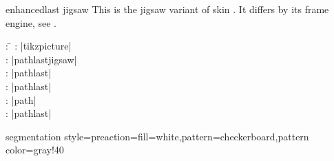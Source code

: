 \clearpage
\begin{docSkin}{enhancedlast jigsaw}
  This is the jigsaw variant of skin .
  It differs by its frame engine, see .
\begin{tcolorbox}[skintable=enhancedlast]
  \begin{tabbing}
    : \=\kill
    :  \> |tikzpicture|\\ 
    :           \> |pathlastjigsaw|\\
    : \> |pathlast|\\ 
    :        \> |pathlast|\\
    :    \> |path|\\
    :           \> |pathlast|
  \end{tabbing}
\end{tcolorbox}
\end{docSkin}


\begin{dispExample*}{segmentation style={preaction={fill=white},pattern=checkerboard,pattern color=gray!40}}
\end{dispExample*}



\clearpage
